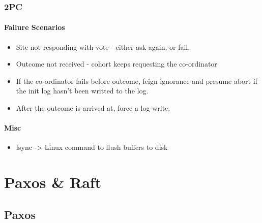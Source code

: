 \documentclass[a4paper]{article}
\begin{document}
\subsubsection{2PC}

\paragraph{Failure Scenarios}

\begin{itemize}
\item
    Site not responding with vote - either ask again, or fail.
\item
    Outcome not received - cohort keeps requesting the co-ordinator
\item
    If the co-ordinator fails before outcome, feign ignorance and presume
    abort if the init log hasn't been writted to the log.
\item
    After the outcome is arrived at, force a log-write.
\end{itemize}

\paragraph{Misc}

\begin{itemize}
\item
    fsync -\textgreater{} Linux command to flush buffers to disk
\end{itemize}

\newpage

\section{Paxos \& Raft}

\subsection{Paxos}
\end{document}
